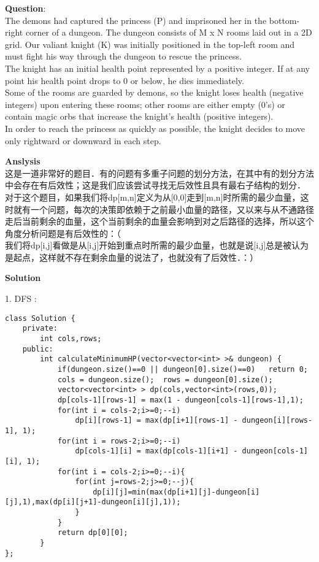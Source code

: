     
\begin{description}
    \item{\textbf{Question}}:\\%
		The demons had captured the princess (P) and imprisoned her in the bottom-right corner of a dungeon. The dungeon consists of M x N rooms laid out in a 2D grid. Our valiant knight (K) was initially positioned in the top-left room and must fight his way through the dungeon to rescue the princess.\\
		The knight has an initial health point represented by a positive integer. If at any point his health point drops to 0 or below, he dies immediately.\\
		Some of the rooms are guarded by demons, so the knight loses health (negative integers) upon entering these rooms; other rooms are either empty (0's) or contain magic orbs that increase the knight's health (positive integers).\\
		In order to reach the princess as quickly as possible, the knight decides to move only rightward or downward in each step.\\

    \item{\textbf{Anslysis}}\\
		这是一道非常好的题目．有的问题有多重子问题的划分方法，在其中有的划分方法中会存在有后效性；这是我们应该尝试寻找无后效性且具有最右子结构的划分．\\
		对于这个题目，如果我们将dp[m,n]定义为从[0,0]走到[m,n]时所需的最少血量，这时就有一个问题，每次的决策即依赖于之前最小血量的路径，又以来与从不通路径走后当前剩余的血量，这个当前剩余的血量会影响到对之后路径的选择，所以这个角度分析问题是有后效性的：（\\
		我们将dp[i,j]看做是从[i,j]开始到重点时所需的最少血量，也就是说[i,j]总是被认为是起点，这样就不存在剩余血量的说法了，也就没有了后效性．：）

    \item{\textbf{Solution}}\\
	\item{1. DFS} : \\
		\begin{lstlisting}
class Solution {
	private:
		int cols,rows;
	public:
		int calculateMinimumHP(vector<vector<int> >& dungeon) {
			if(dungeon.size()==0 || dungeon[0].size()==0)	return 0;
			cols = dungeon.size();	rows = dungeon[0].size();
			vector<vector<int> > dp(cols,vector<int>(rows,0));
			dp[cols-1][rows-1] = max(1 - dungeon[cols-1][rows-1],1);
			for(int i = cols-2;i>=0;--i)
				dp[i][rows-1] = max(dp[i+1][rows-1] - dungeon[i][rows-1], 1);
			for(int i = rows-2;i>=0;--i)
				dp[cols-1][i] = max(dp[cols-1][i+1] - dungeon[cols-1][i], 1);
			for(int i = cols-2;i>=0;--i){
				for(int j=rows-2;j>=0;--j){
					dp[i][j]=min(max(dp[i+1][j]-dungeon[i][j],1),max(dp[i][j+1]-dungeon[i][j],1));
				}
			}
			return dp[0][0];
		}
};
		\end{lstlisting}


\end{description}
